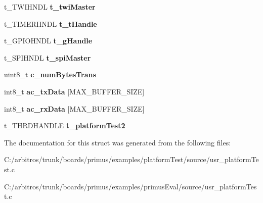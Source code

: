 \begin{DoxyCompactItemize}
\item 
\hypertarget{structt__platform_test_object_afd3667ecabb89e26ef002ece02449c39}{t\-\_\-\-T\-W\-I\-H\-N\-D\-L {\bfseries t\-\_\-twi\-Master}}\label{structt__platform_test_object_afd3667ecabb89e26ef002ece02449c39}

\item 
\hypertarget{structt__platform_test_object_ac3f880c8de36add4d8c7bdbd1850b294}{t\-\_\-\-T\-I\-M\-E\-R\-H\-N\-D\-L {\bfseries t\-\_\-t\-Handle}}\label{structt__platform_test_object_ac3f880c8de36add4d8c7bdbd1850b294}

\item 
\hypertarget{structt__platform_test_object_a238c9f6ab090b5adc9aa29fbe18b2b9a}{t\-\_\-\-G\-P\-I\-O\-H\-N\-D\-L {\bfseries t\-\_\-g\-Handle}}\label{structt__platform_test_object_a238c9f6ab090b5adc9aa29fbe18b2b9a}

\item 
\hypertarget{structt__platform_test_object_a9713400edd816a4dbd95e4363bb1c79d}{t\-\_\-\-S\-P\-I\-H\-N\-D\-L {\bfseries t\-\_\-spi\-Master}}\label{structt__platform_test_object_a9713400edd816a4dbd95e4363bb1c79d}

\item 
\hypertarget{structt__platform_test_object_a39af9d71b1364047baa558cfb885a5d3}{uint8\-\_\-t {\bfseries c\-\_\-num\-Bytes\-Trans}}\label{structt__platform_test_object_a39af9d71b1364047baa558cfb885a5d3}

\item 
\hypertarget{structt__platform_test_object_aa94b7a7ff365b332a02f88c792ad2f24}{int8\-\_\-t {\bfseries ac\-\_\-tx\-Data} \mbox{[}M\-A\-X\-\_\-\-B\-U\-F\-F\-E\-R\-\_\-\-S\-I\-Z\-E\mbox{]}}\label{structt__platform_test_object_aa94b7a7ff365b332a02f88c792ad2f24}

\item 
\hypertarget{structt__platform_test_object_ab51b8615ef0c60e36baf8b3cfece7e7f}{int8\-\_\-t {\bfseries ac\-\_\-rx\-Data} \mbox{[}M\-A\-X\-\_\-\-B\-U\-F\-F\-E\-R\-\_\-\-S\-I\-Z\-E\mbox{]}}\label{structt__platform_test_object_ab51b8615ef0c60e36baf8b3cfece7e7f}

\item 
\hypertarget{structt__platform_test_object_a964ace9cbcf3d2eb59ab048b068c660b}{t\-\_\-\-T\-H\-R\-D\-H\-A\-N\-D\-L\-E {\bfseries t\-\_\-platform\-Test2}}\label{structt__platform_test_object_a964ace9cbcf3d2eb59ab048b068c660b}

\end{DoxyCompactItemize}


The documentation for this struct was generated from the following files\-:\begin{DoxyCompactItemize}
\item 
C\-:/arbitros/trunk/boards/primus/examples/platform\-Test/source/usr\-\_\-platform\-Test.\-c\item 
C\-:/arbitros/trunk/boards/primus/examples/primus\-Eval/source/usr\-\_\-platform\-Test.\-c\end{DoxyCompactItemize}
